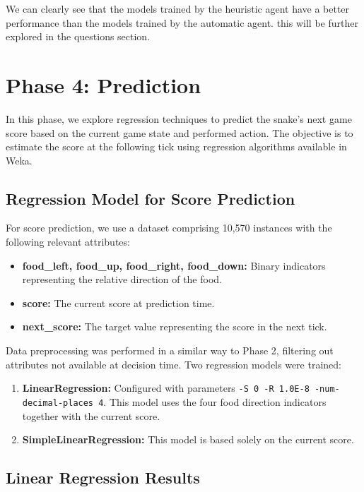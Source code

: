 \documentclass[12pt,a4paper]{article}
\begin{document}
We can clearly see that the models trained by the heuristic agent have a better performance than the models trained by the automatic agent.
this will be further explored in the questions section.



\section{Phase 4: Prediction}

In this phase, we explore regression techniques to predict the snake's next game score based on the current game state and performed action. The objective is to estimate the score at the following tick using regression algorithms available in Weka.

\subsection{Regression Model for Score Prediction}

For score prediction, we use a dataset comprising 10,570 instances with the following relevant attributes:
\begin{itemize}
    \item \textbf{food\_left, food\_up, food\_right, food\_down:} Binary indicators representing the relative direction of the food.
    \item \textbf{score:} The current score at prediction time.
    \item \textbf{next\_score:} The target value representing the score in the next tick.
\end{itemize}

Data preprocessing was performed in a similar way to Phase 2, filtering out attributes not available at decision time. Two regression models were trained:
\begin{enumerate}
    \item \textbf{LinearRegression:} Configured with parameters \texttt{-S 0 -R 1.0E-8 -num-decimal-places 4}. This model uses the four food direction indicators together with the current score.
    \item \textbf{SimpleLinearRegression:} This model is based solely on the current score.
\end{enumerate}

\subsection{Linear Regression Results}
\end{document}
